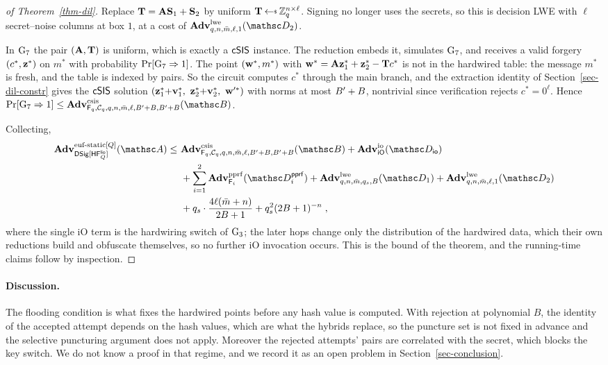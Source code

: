 \begin{proof}[of Theorem~\ref{thm-dil}]
 Replace $\mathbf{T} = \mathbf{A}\mathbf{S}_1 + \mathbf{S}_2$ by uniform $\mat{T} \getsr \Zq^{n\times\ell}$. Signing no longer uses the secrets, so this is decision LWE with $\ell$ secret--noise columns at box $1$, at a cost of $\AdvLWE{q,n,\colsA,\ell,1}{\advD_2}$.

 In $\textnormal{G}_7$ the pair $(\mathbf{A}, \mathbf{T})$ is uniform, which is exactly a $\mathsf{cSIS}$ instance. The reduction embeds it, simulates $\textnormal{G}_7$, and receives a valid forgery $(c^*, \mathbf{z}^*)$ on $m^*$ with probability $\Pr[\textnormal{G}_7 \Rightarrow 1]$. The point $(\mathbf{w}^*, m^*)$ with $\mathbf{w}^* = \mathbf{A}\mathbf{z}^*_1 + \mathbf{z}^*_2 - \mathbf{T}c^*$ is not in the hardwired table: the message $m^*$ is fresh, and the table is indexed by pairs. So the circuit computes $c^*$ through the main branch, and the extraction identity of Section~\ref{sec-dil-constr} gives the $\mathsf{cSIS}$ solution $(\mat{z}^*_1{+}\mat{v}^*_1,\ \mat{z}^*_2{+}\mat{v}^*_2,\ \mat{w}'^*)$ with norms at most $B' + B$, nontrivial since verification rejects $c^* = 0^\ell$. Hence $\Pr[\Gm_7 \Rightarrow 1] \le \AdvCSIS{\Fq_q,\chal_q,q,n,\colsA,\ell,\Bclip+B,\Bclip+B}{\advB}$.

 Collecting,
$$
\begin{aligned}
\AdvEUFSTATICQ{\DSScheme[\HF^{\mathsf{lio}}_Q]}{\advA}
\le\ &\AdvCSIS{\Fq_q,\chal_q,q,n,\colsA,\ell,\Bclip+B,\Bclip+B}{\advB}
+ \AdvIO{\iO}{\advD_{\mathsf{io}}} \\
&+ \sum_{i=1}^{2}\AdvPPRF{\PRF_i}{\advD^{\mathsf{pprf}}_i}
+ \AdvLWE{q,n,\colsA,q_s,B}{\advD_1}
+ \AdvLWE{q,n,\colsA,\ell,1}{\advD_2} \\
&+ q_s \cdot \frac{4\ell(\colsA+n)}{2B+1}
+ q_s^2(2B+1)^{-n} \;,
\end{aligned}
$$
where the single iO term is the hardwiring switch of $\textnormal{G}_3$; the later hops change only the distribution of the hardwired data, which their own reductions build and obfuscate themselves, so no further iO invocation occurs. This is the bound of the theorem, and the running-time claims follow by inspection.
\end{proof}

\paragraph*{Discussion.} The flooding condition is what fixes the hardwired points before any hash value is computed. With rejection at polynomial $B$, the identity of the accepted attempt depends on the hash values, which are what the hybrids replace, so the puncture set is not fixed in advance and the selective puncturing argument does not apply. Moreover the rejected attempts' pairs are correlated with the secret, which blocks the key switch. We do not know a proof in that regime, and we record it as an open problem in Section~\ref{sec-conclusion}. 


